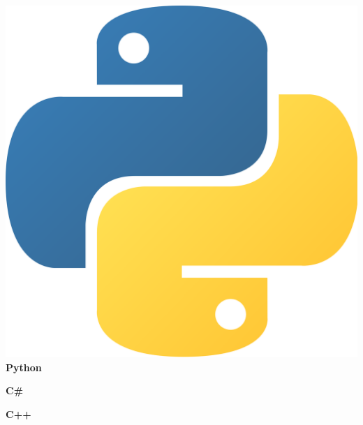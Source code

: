\documentclass[a4paper]{friggeri-cv}
\begin{document}
\begin{aside}
        \includegraphics[scale=0.0045]{../assets/images/logos/Python_logo.png} \textbf{Python}%

        \textbf{C\#}%

        \textbf{C++}%


\end{aside}
\end{document}

